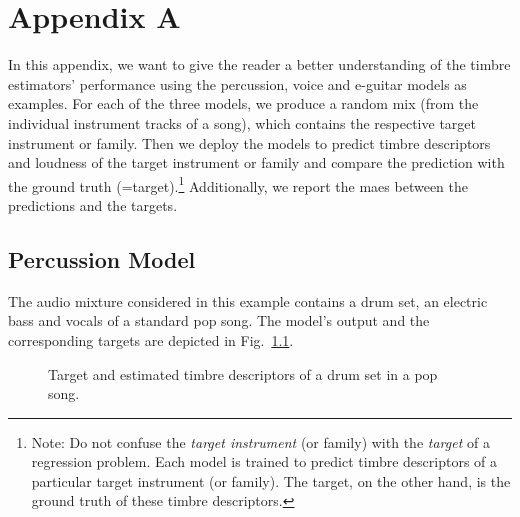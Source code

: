 \chapter{Appendix A}

In this appendix, we want to give the reader a better understanding of the timbre estimators' performance using the percussion, voice and e-guitar models as examples. For each of the three models, we produce a random mix (from the individual instrument tracks of a song), which contains the respective target instrument or family. Then we deploy the models to predict timbre descriptors and loudness of the target instrument or family and compare the prediction with the ground truth (=target).\footnote{Note: Do not confuse the \textit{target instrument} (or family) with the \textit{target} of a regression problem. Each model is trained to predict timbre descriptors of a particular target instrument (or family). The target, on the other hand, is the ground truth of these timbre descriptors.} Additionally, we report the \glspl{mae} between the predictions and the targets.
\section*{Percussion Model}
The audio mixture considered in this example contains a drum set, an electric bass and vocals of a standard pop song. The model's output and the corresponding targets are depicted in Fig.~\ref{fig:percussion-model}. 
\begin{figure}
	\captionsetup{list=no}
	\centering
	\caption{Target and estimated timbre descriptors of a drum set in a pop song.}\label{fig:percussion-model}
\end{figure}
